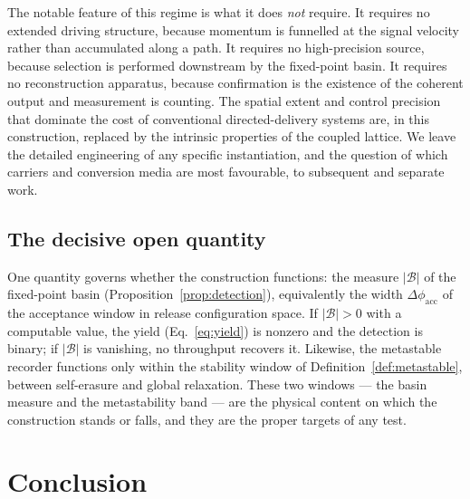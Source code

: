\documentclass[twocolumn,10pt,a4paper]{article}
\theoremstyle{thmstyle}
\theoremstyle{definition}
\theoremstyle{remark}
\begin{document}
The notable feature of this regime is what it does \emph{not} require. It
requires no extended driving structure, because momentum is funnelled at the
signal velocity rather than accumulated along a path. It requires no
high-precision source, because selection is performed downstream by the
fixed-point basin. It requires no reconstruction apparatus, because
confirmation is the existence of the coherent output and measurement is
counting. The spatial extent and control precision that dominate the cost of
conventional directed-delivery systems are, in this construction, replaced by
the intrinsic properties of the coupled lattice. We leave the detailed
engineering of any specific instantiation, and the question of which carriers
and conversion media are most favourable, to subsequent and separate work.

\subsection{The decisive open quantity}

One quantity governs whether the construction functions: the measure
$|\mathcal{B}|$ of the fixed-point basin (Proposition~\ref{prop:detection}),
equivalently the width $\Delta\phi_{\mathrm{acc}}$ of the acceptance window in
release configuration space. If $|\mathcal{B}|>0$ with a computable value,
the yield (Eq.~\eqref{eq:yield}) is nonzero and the detection is binary; if
$|\mathcal{B}|$ is vanishing, no throughput recovers it. Likewise, the
metastable recorder functions only within the stability window of
Definition~\ref{def:metastable}, between self-erasure and global relaxation.
These two windows --- the basin measure and the metastability band --- are the
physical content on which the construction stands or falls, and they are the
proper targets of any test.

\section{Conclusion}
\label{sec:conclusion}
\end{document}
